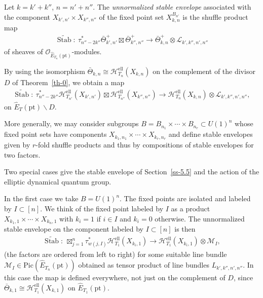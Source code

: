 \documentclass[10pt,a4paper]{amsart}
\numberwithin{equation}{section}
\begin{document}
\begin{Definition} Let $k=k'+k''$, $n=n'+n''$. The {\em unnormalized stable envelope} associated with the component $X_{k',n'}\times X_{k'',n''}$ of the fixed point set $X_{k,n}^{B_{n'}}$ is the shuffle product map
 \begin{gather*}
 \widetilde{\operatorname{Stab}}\colon \ \tau_{n''-2k''}^*\bar\Theta^+_{k',n'} \boxtimes\bar\Theta^+_{k'',n''} \to \bar\Theta^+_{k,n}\otimes\mathcal L_{k',k'',n',n''}
 \end{gather*}
 of sheaves of $\mathcal O_{\hat E_{T_n}(\mathrm{pt})}$-modules.
\end{Definition}
By using the isomorphism $\bar\Theta_{k,n}\cong\mathcal H_{T_n}^{\mathrm{ell}}(X_{k,n})$ on the complement of the divisor $D$ of Theorem~\ref{th-0}, we obtain a map
\begin{gather*}
 \widetilde{\operatorname{Stab}}\colon \ \tau_{n''-2k''}^*\mathcal H^{\mathrm{ell}}_{T_{n'}}(X_{k',n'}) \boxtimes\mathcal H^{\mathrm{ell}}_{T_{n''}}(X_{k'',n''}) \to\mathcal H^{\mathrm{ell}}_{T_n}(X_{k,n})\otimes \mathcal L_{k',k'',n',n''},
\end{gather*}
on $\hat E_T(\mathrm{pt})\smallsetminus D$.

More generally, we may consider subgroups $B=B_{n_1}\times\cdots \times B_{n_r}\subset U(1)^n$ whose fixed point sets have components $X_{k_1,n_1}\times\cdots \times X_{k_r,n_r}$ and define stable envelopes given by $r$-fold shuffle products and thus by compositions of stable envelopes for two factors.

Two special cases give the stable envelope of Section~\ref{ss-5.5} and the action of the elliptic dynamical quantum group.

In the first case we take $B=U(1)^n$. The fixed points are isolated and labeled by $I\subset[n]$. We think of the fixed point labeled by $I$ as a product $X_{k_1,1}\times\cdots\times X_{k_n,1}$ with $k_i=1$ if $i\in I$ and $k_i=0$ otherwise. The unnormalized stable envelope on the component labeled by $I\subset [n]$ is then
\begin{gather*}
 \widetilde {\operatorname{Stab}}\colon \ \boxtimes_{j=1}^n \tau^*_{w(j,I)}\mathcal H^{\mathrm{ell}}_{T_1}(X_{k_i,1}) \to\mathcal H^{\mathrm{ell}}_{T_1}(X_{k_i,1})\otimes \mathcal M_I,
\end{gather*}
(the factors are ordered from left to right) for some suitable line bundle $\mathcal M_I\in\mathrm{Pic}(\hat E_{T_n}(\mathrm{pt}))$ obtained as tensor product of line bundles $L_{k',k'',n',n''}$. In this case the map is defined everywhere, not just on the complement of $D$, since $\bar\Theta_{k,1}\cong \mathcal H^\mathrm{ell}_{T_1}(X_{k,1})$ on $\hat E_{T_1}(\mathrm{pt})$.
\end{document}
